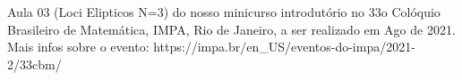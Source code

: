 Aula 03 (Loci Elipticos N=3) do nosso minicurso introdutório no 33o Colóquio Brasileiro de Matemática, IMPA, Rio de Janeiro, a ser realizado em Ago de 2021. Mais infos sobre o evento: https://impa.br/en_US/eventos-do-impa/2021-2/33cbm/
